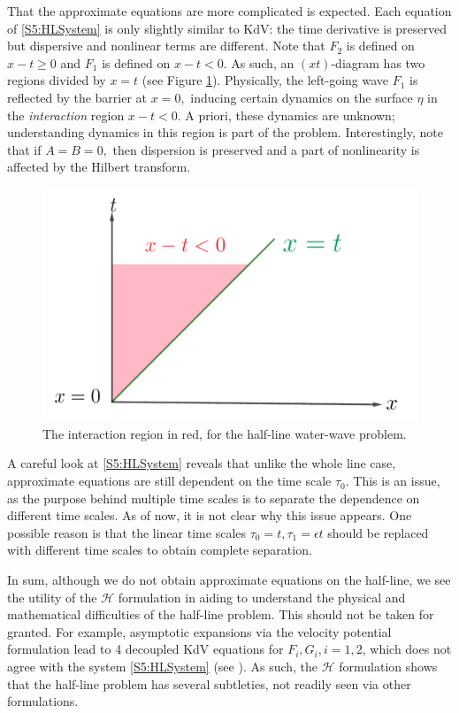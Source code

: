 That the approximate equations are more complicated is expected. Each equation of \eqref{S5:HLSystem} is only slightly similar to KdV: the time derivative is preserved but dispersive and nonlinear terms are different. Note that $F_2$ is defined on $x - t \geq 0$ and $F_1$ is defined on $x - t < 0.$ As such, an $(xt)$-diagram has two regions divided by $x = t$ (see Figure \ref{fig:xtplot}). Physically, the left-going wave $F_1$ is reflected by the barrier at $x = 0,$ inducing certain dynamics on the surface $\eta$ in the \textit{interaction} region $x-t <0.$ A priori, these dynamics are unknown; understanding dynamics in this region is part of the problem. Interestingly, note that if $A = B = 0,$ then dispersion is preserved and a part of nonlinearity is affected by the Hilbert transform.

\begin{figure}[h]
\captionsetup{width=\textwidth}
\centering
\includegraphics[width=0.6\linewidth]{figures/xtplot.pdf}
\caption{The interaction region in red, for the half-line water-wave problem.}
\label{fig:xtplot}
\end{figure}

A careful look at \eqref{S5:HLSystem} reveals that unlike the whole line case, approximate equations are still dependent on the time scale $\tau_0.$ This is an issue, as the purpose behind  multiple time scales is to separate the dependence on different time scales. As of now, it is not clear why this issue appears. One possible reason is that the linear time scales $\tau_0 = t, \tau_1 = \epsilon t$ should be replaced with different time scales to obtain complete separation.

In sum, although we do not obtain approximate equations on the half-line, we see the utility of the $\mathcal{H}$ formulation in aiding to understand the physical and mathematical difficulties of the half-line problem. This should not be taken for granted. For example, asymptotic expansions via the velocity potential formulation lead to 4 decoupled KdV equations for $F_i, G_i, i =1, 2$, which does not agree with the system \eqref{S5:HLSystem} (see \cite{Sultan1}). As such, the $\mathcal{H}$ formulation shows that the half-line problem has several subtleties,  not readily seen via other formulations. 

